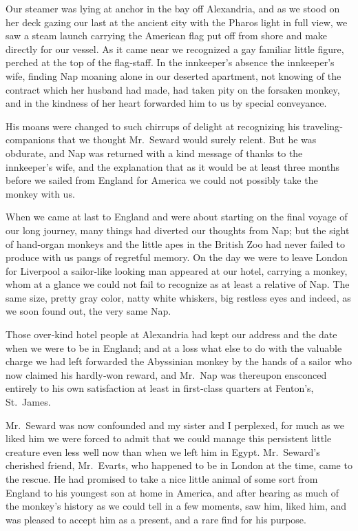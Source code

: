 \documentclass[12pt]{book}
\begin{document}
Our steamer was lying at anchor in the bay off Alexandria, and as we stood
on her deck gazing our last at the ancient city with the Pharos light in full view,
we saw a steam launch carrying the American flag put off from shore and make
directly for our vessel. As it came near we recognized a gay familiar little figure,
perched at the top of the flag‐staff. In the innkeeper’s absence the innkeeper’s
wife, finding Nap moaning alone in our deserted apartment, not knowing of the
contract which her husband had made, had taken pity on the forsaken monkey,
and in the kindness of her heart forwarded him to us by special conveyance.

His moans were changed to such chirrups of delight at recognizing his traveling‐companions that we thought Mr.~Seward would surely relent. But he was
obdurate, and Nap was returned with a kind message of thanks to the innkeeper’s
wife, and the explanation that as it would be at least three months before we
sailed from England for America we could not possibly take the monkey with us.

When we came at last to England and were about starting on the final voyage
of our long journey, many things had diverted our thoughts from Nap; but the
sight of hand‐organ monkeys and the little apes in the British Zoo had never
failed to produce with us pangs of regretful memory. On the day we were to leave
London for Liverpool a sailor‐like looking man appeared at our hotel, carrying a
monkey, whom at a glance we could not fail to recognize as at least a relative of
Nap. The same size, pretty gray color, natty white whiskers, big restless eyes and
indeed, as we soon found out, the very same Nap.

Those over‐kind hotel people at Alexandria had kept our address and the date
when we were to be in England; and at a loss what else to do with the valuable
charge we had left forwarded the Abyssinian monkey by the hands of a sailor
who now claimed his hardly‐won reward, and Mr.~Nap was thereupon ensconced
entirely to his own satisfaction at least in first‐class quarters at Fenton’s, St.~James.

Mr.~Seward was now confounded and my sister and I perplexed, for much
as we liked him we were forced to admit that we could manage this persistent
little creature even less well now than when we left him in Egypt. Mr.~Seward’s
cherished friend, Mr.~Evarts, who happened to be in London at the time, came
to the rescue. He had promised to take a nice little animal of some sort from
England to his youngest son at home in America, and after hearing as much of
the monkey’s history as we could tell in a few moments, saw him, liked him, and
was pleased to accept him as a present, and a rare find for his purpose.
\end{document}

